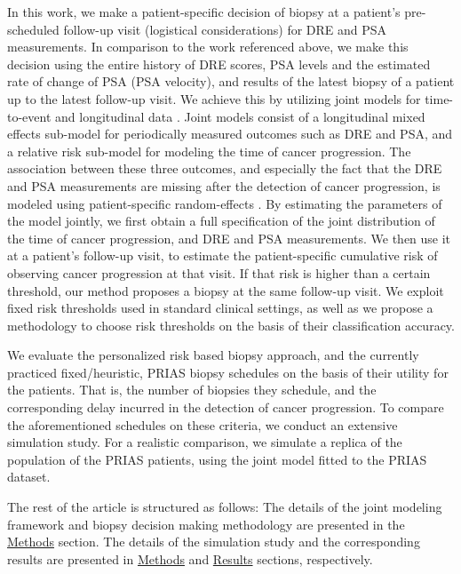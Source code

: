 In this work, we make a patient-specific decision of biopsy at a patient's pre-scheduled follow-up visit (logistical considerations) for DRE and PSA measurements. In comparison to the work referenced above, we make this decision using the entire history of DRE scores, PSA levels and the estimated rate of change of PSA (PSA velocity), and results of the latest biopsy of a patient up to the latest follow-up visit. We achieve this by utilizing joint models for time-to-event and longitudinal data \cite{tsiatis2004joint,rizopoulos2012joint}. Joint models consist of a longitudinal mixed effects sub-model for periodically measured outcomes such as DRE and PSA, and a relative risk sub-model for modeling the time of cancer progression. The association between these three outcomes, and especially the fact that the DRE and PSA measurements are missing after the detection of cancer progression, is modeled using patient-specific random-effects \cite{laird1982random}. By estimating the parameters of the model jointly, we first obtain a full specification of the joint distribution of the time of cancer progression, and DRE and PSA measurements. We then use it at a patient's follow-up visit, to estimate the patient-specific cumulative risk of observing cancer progression at that visit. If that risk is higher than a certain threshold, our method proposes a biopsy at the same follow-up visit. We exploit fixed risk thresholds used in standard clinical settings, as well as we propose a methodology to choose risk thresholds on the basis of their classification accuracy.

We evaluate the personalized risk based biopsy approach, and the currently practiced fixed/heuristic, PRIAS biopsy schedules on the basis of their utility for the patients. That is, the number of biopsies they schedule, and the corresponding delay incurred in the detection of cancer progression. To compare the aforementioned schedules on these criteria, we conduct an extensive simulation study. For a realistic comparison, we simulate a replica of the population of the PRIAS patients, using the joint model fitted to the PRIAS dataset.

The rest of the article is structured as follows: The details of the joint modeling framework and biopsy decision making methodology are presented in the \hyperref[sec:methods]{Methods} section. The details of the simulation study and the corresponding results are presented in \hyperref[sec:methods]{Methods} and \hyperref[sec:results]{Results} sections, respectively.